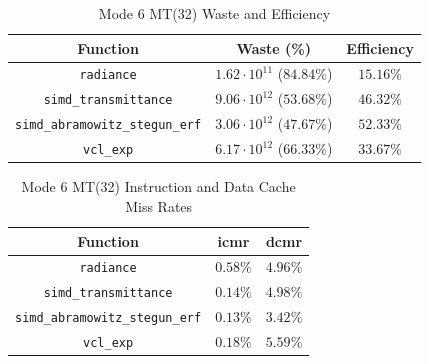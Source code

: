 \documentclass[a4paper, 11pt]{memoir}
\begin{document}
    \begin{table}[ht]
        \centering
        \begin{tabular}{|c|c|c|}
            \hline
            Function                                     & Waste (\%)                       & Efficiency\\\hline
            \texttt{radiance}                   & $1.62 \cdot 10^{11}$ ($84.84\%$) & $15.16\%$\\
            \texttt{simd_transmittance}         & $9.06 \cdot 10^{12}$ ($53.68\%$) & $46.32\%$\\
            \texttt{simd_abramowitz_stegun_erf} & $3.06 \cdot 10^{12}$ ($47.67\%$) & $52.33\%$\\
            \texttt{vcl_exp}                    & $6.17 \cdot 10^{12}$ ($66.33\%$) & $33.67\%$\\
            \hline
        \end{tabular}
        \caption{Mode 6 MT(32) Waste and Efficiency}
        \label{tab:mode_6_mt_wae}
    \end{table}

    \begin{table}[ht]
        \centering
        \begin{tabular}{|c|c|c|}
            \hline
            Function                                     & icmr     & dcmr\\\hline
            \texttt{radiance}                   & $0.58\%$ & $4.96\%$\\
            \texttt{simd_transmittance}         & $0.14\%$ & $4.98\%$\\
            \texttt{simd_abramowitz_stegun_erf} & $0.13\%$ & $3.42\%$\\
            \texttt{vcl_exp}                    & $0.18\%$ & $5.59\%$\\
            \hline
        \end{tabular}
        \caption{Mode 6 MT(32) Instruction and Data Cache Miss Rates}
        \label{tab:mode_6_mt_cmr}
    \end{table}
\end{document}
